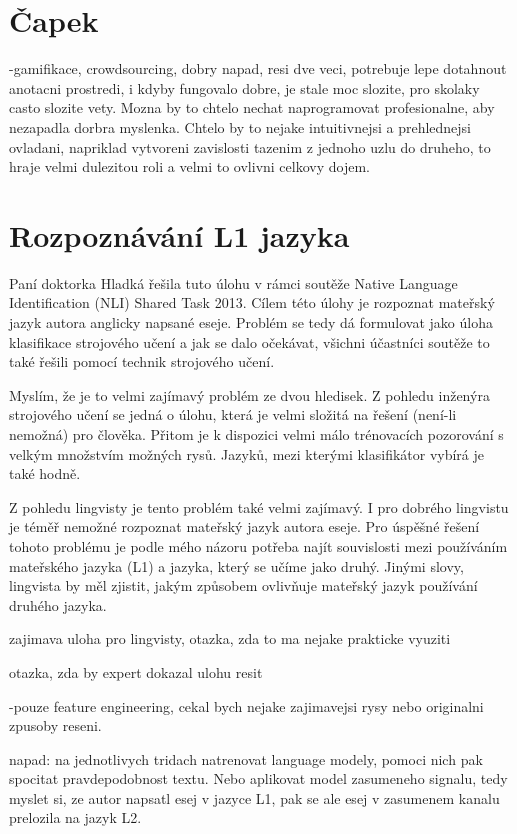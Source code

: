 \documentclass[12pt,a4paper]{report}
\begin{document}
\section*{Čapek}

-gamifikace, crowdsourcing, dobry napad, resi dve veci, potrebuje lepe dotahnout anotacni
prostredi, i kdyby fungovalo dobre, je stale moc slozite, pro skolaky casto slozite vety.  
Mozna by to chtelo nechat naprogramovat profesionalne, aby nezapadla dorbra myslenka. Chtelo by to nejake
intuitivnejsi a prehlednejsi  ovladani, napriklad vytvoreni zavislosti tazenim z jednoho uzlu do druheho,
to hraje velmi dulezitou roli a velmi to ovlivni celkovy dojem. 

\section*{Rozpoznávání L1 jazyka}

Paní doktorka Hladká řešila tuto úlohu v rámci soutěže Native Language
Identification (NLI) Shared Task 2013.  Cílem této úlohy je rozpoznat mateřský
jazyk autora anglicky napsané eseje.  Problém se tedy dá formulovat jako úloha
klasifikace strojového učení a jak se dalo očekávat, všichni účastníci soutěže
to také řešili pomocí technik strojového učení. 

Myslím, že je to velmi zajímavý problém ze dvou hledisek. Z pohledu inženýra
strojového učení se jedná o úlohu, která je velmi složitá na řešení (není-li
nemožná) pro člověka. Přitom je k dispozici velmi málo trénovacích pozorování s
velkým množstvím možných rysů. Jazyků, mezi kterými klasifikátor vybírá je také
hodně.

Z pohledu lingvisty je tento problém také velmi zajímavý.  I pro dobrého
lingvistu je téměř nemožné rozpoznat mateřský jazyk autora eseje.  Pro úspěšné
řešení tohoto problému je podle mého názoru potřeba najít souvislosti mezi používáním 
mateřského jazyka (L1) a jazyka, který se učíme jako druhý. Jinými slovy, lingvista
by měl zjistit, jakým způsobem ovlivňuje mateřský jazyk používání druhého jazyka.



zajimava uloha pro lingvisty, otazka, zda to ma nejake prakticke vyuziti

otazka, zda by expert dokazal ulohu resit

-pouze feature engineering, cekal bych nejake zajimavejsi rysy nebo originalni zpusoby reseni. 

napad: na jednotlivych tridach natrenovat language modely, pomoci nich pak spocitat pravdepodobnost textu. Nebo aplikovat
model zasumeneho signalu, tedy myslet si, ze autor napsatl esej v jazyce L1, pak se ale esej v zasumenem kanalu prelozila na jazyk L2.
\end{document}
